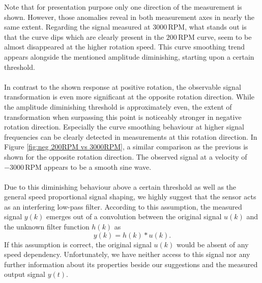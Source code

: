 \documentclass[english]{isasthesis}
\begin{document}
    	Note that for presentation purpose only one direction of the measurement is shown. However, those anomalies reveal in both measurement axes in nearly the same extent. Regarding the signal measured at $3000\,$RPM, what stands out is that the curve dips which are clearly present in the $200\,$RPM curve, seem to be almost disappeared at the higher rotation speed. This curve smoothing trend appears alongside the mentioned amplitude diminishing, starting upon a certain threshold. \\\\
    	In contrast to the shown response at positive rotation, the observable signal transformation is even more significant at the opposite rotation direction. While the amplitude diminishing threshold is approximately even, the extent of transformation when surpassing this point is noticeably stronger in negative rotation direction. Especially the curve smoothing behaviour at higher signal frequencies can be clearly detected in measurements at this rotation direction. In Figure \ref{fig:neg 200RPM vs 3000RPM}, a similar comparison as the previous is shown for the opposite rotation direction. The observed signal at a velocity of $-3000\,$RPM appears to be a smooth sine wave. \\\\
    		Due to this diminishing behaviour above a certain threshold as well as the general speed proportional signal shaping, we highly suggest that the sensor acts as an interfering low-pass filter. According to this assumption, the measured signal $y(k)$ emerges out of a convolution between the original signal $u(k)$ and the unknown filter function $h(k)$ as
    		\begin{equation}
				y(k) = h(k)*u(k).\label{eq:convolution}   		
			\end{equation}
		If this assumption is correct, the original signal $u(k)$ would be absent of any speed dependency. Unfortunately, we have neither access to this signal nor any further information about its properties beside our suggestions and the measured output signal $y(t)$. 			
    
\end{document}
